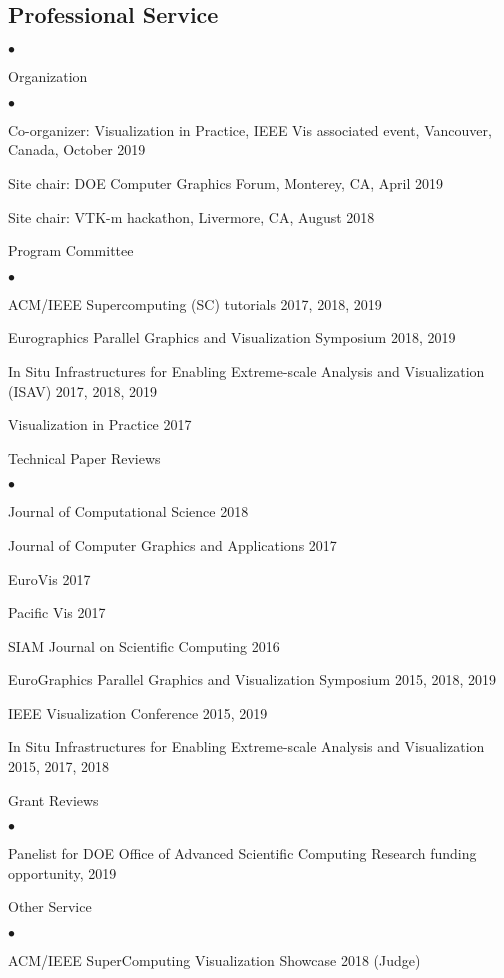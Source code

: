 \documentclass[margin,line]{res}
\newenvironment{list2}{
  \begin{list}{$\bullet$}{%
      \setlength{\itemsep}{0in}
      \setlength{\parsep}{0in} \setlength{\parskip}{0in}
      \setlength{\topsep}{0in} \setlength{\partopsep}{0in}
      \setlength{\leftmargin}{0.2in}}}{\end{list}}
\begin{document}
\begin{resume}
\section{\sc Professional Service}
\begin{list2}
	\item Organization
		\begin{list2}
			\item Co-organizer: Visualization in Practice, IEEE Vis associated event, Vancouver, Canada, October 2019
			\item Site chair: DOE Computer Graphics Forum, Monterey, CA, April 2019
			\item Site chair: VTK-m hackathon, Livermore, CA, August 2018
		\end{list2}
	\item Program Committee
		\begin{list2}
			\item ACM/IEEE Supercomputing (SC) tutorials 2017, 2018, 2019
			\item Eurographics Parallel Graphics and Visualization Symposium 2018, 2019
			\item In Situ Infrastructures for Enabling Extreme-scale Analysis and Visualization (ISAV) 2017, 2018, 2019
		    \item Visualization in Practice 2017
		\end{list2}
	\item Technical Paper Reviews
	\begin{list2}
		\item Journal of Computational Science 2018
		\item Journal of Computer Graphics and Applications 2017
		\item EuroVis 2017
		\item Pacific Vis 2017
		\item SIAM Journal on Scientific Computing 2016
		\item EuroGraphics Parallel Graphics and Visualization Symposium 2015, 2018, 2019
		\item IEEE Visualization Conference 2015, 2019
		\item In Situ Infrastructures for Enabling Extreme-scale Analysis and Visualization  2015, 2017, 2018
	\end{list2}
	\item Grant Reviews
	\begin{list2}
    \item Panelist for DOE Office of Advanced Scientific Computing Research funding opportunity, 2019
	\end{list2}
	\item Other Service
	\begin{list2}
		\item ACM/IEEE SuperComputing Visualization Showcase 2018 (Judge)
	\end{list2}
\end{list2}

\end{resume}
\end{document}
